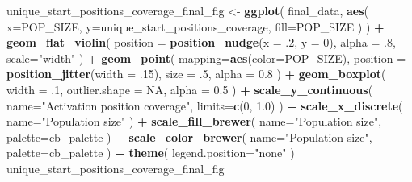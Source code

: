 \documentclass[]{book}
\newenvironment{Shaded}{\begin{snugshade}}{\end{snugshade}}
\newcommand{\DataTypeTok}[1]{\textcolor[rgb]{0.13,0.29,0.53}{#1}}
\newcommand{\DecValTok}[1]{\textcolor[rgb]{0.00,0.00,0.81}{#1}}
\newcommand{\FloatTok}[1]{\textcolor[rgb]{0.00,0.00,0.81}{#1}}
\newcommand{\KeywordTok}[1]{\textcolor[rgb]{0.13,0.29,0.53}{\textbf{#1}}}
\newcommand{\NormalTok}[1]{#1}
\newcommand{\OperatorTok}[1]{\textcolor[rgb]{0.81,0.36,0.00}{\textbf{#1}}}
\newcommand{\OtherTok}[1]{\textcolor[rgb]{0.56,0.35,0.01}{#1}}
\newcommand{\StringTok}[1]{\textcolor[rgb]{0.31,0.60,0.02}{#1}}
\begin{document}
\begin{Shaded}
\begin{Highlighting}[]
\NormalTok{unique_start_positions_coverage_final_fig <-}\StringTok{ }\KeywordTok{ggplot}\NormalTok{(}
\NormalTok{    final_data,}
    \KeywordTok{aes}\NormalTok{(}
      \DataTypeTok{x=}\NormalTok{POP_SIZE,}
      \DataTypeTok{y=}\NormalTok{unique_start_positions_coverage,}
      \DataTypeTok{fill=}\NormalTok{POP_SIZE}
\NormalTok{    )}
\NormalTok{  ) }\OperatorTok{+}
\StringTok{  }\KeywordTok{geom_flat_violin}\NormalTok{(}
    \DataTypeTok{position =} \KeywordTok{position_nudge}\NormalTok{(}\DataTypeTok{x =} \FloatTok{.2}\NormalTok{, }\DataTypeTok{y =} \DecValTok{0}\NormalTok{),}
    \DataTypeTok{alpha =} \FloatTok{.8}\NormalTok{,}
    \DataTypeTok{scale=}\StringTok{"width"}
\NormalTok{  ) }\OperatorTok{+}
\StringTok{  }\KeywordTok{geom_point}\NormalTok{(}
    \DataTypeTok{mapping=}\KeywordTok{aes}\NormalTok{(}\DataTypeTok{color=}\NormalTok{POP_SIZE),}
    \DataTypeTok{position =} \KeywordTok{position_jitter}\NormalTok{(}\DataTypeTok{width =} \FloatTok{.15}\NormalTok{),}
    \DataTypeTok{size =} \FloatTok{.5}\NormalTok{,}
    \DataTypeTok{alpha =} \FloatTok{0.8}
\NormalTok{  ) }\OperatorTok{+}
\StringTok{  }\KeywordTok{geom_boxplot}\NormalTok{(}
    \DataTypeTok{width =} \FloatTok{.1}\NormalTok{,}
    \DataTypeTok{outlier.shape =} \OtherTok{NA}\NormalTok{,}
    \DataTypeTok{alpha =} \FloatTok{0.5}
\NormalTok{  ) }\OperatorTok{+}
\StringTok{  }\KeywordTok{scale_y_continuous}\NormalTok{(}
    \DataTypeTok{name=}\StringTok{"Activation position coverage"}\NormalTok{,}
    \DataTypeTok{limits=}\KeywordTok{c}\NormalTok{(}\DecValTok{0}\NormalTok{, }\FloatTok{1.0}\NormalTok{)}
\NormalTok{  ) }\OperatorTok{+}
\StringTok{  }\KeywordTok{scale_x_discrete}\NormalTok{(}
    \DataTypeTok{name=}\StringTok{"Population size"}
\NormalTok{  ) }\OperatorTok{+}
\StringTok{  }\KeywordTok{scale_fill_brewer}\NormalTok{(}
    \DataTypeTok{name=}\StringTok{"Population size"}\NormalTok{,}
    \DataTypeTok{palette=}\NormalTok{cb_palette}
\NormalTok{  ) }\OperatorTok{+}
\StringTok{  }\KeywordTok{scale_color_brewer}\NormalTok{(}
    \DataTypeTok{name=}\StringTok{"Population size"}\NormalTok{,}
    \DataTypeTok{palette=}\NormalTok{cb_palette}
\NormalTok{  ) }\OperatorTok{+}
\StringTok{  }\KeywordTok{theme}\NormalTok{(}
    \DataTypeTok{legend.position=}\StringTok{"none"}
\NormalTok{  )}
\NormalTok{unique_start_positions_coverage_final_fig}
\end{Highlighting}
\end{Shaded}
\end{document}

